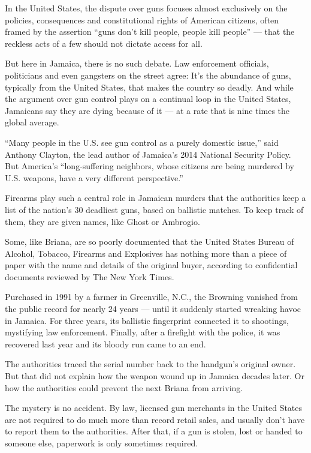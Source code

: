 In the United States, the dispute over guns focuses almost exclusively
on the policies, consequences and constitutional rights of American
citizens, often framed by the assertion ``guns don't kill people, people
kill people'' --- that the reckless acts of a few should not dictate
access for all.

But here in Jamaica, there is no such debate. Law enforcement officials,
politicians and even gangsters on the street agree: It's the abundance
of guns, typically from the United States, that makes the country so
deadly. And while the argument over gun control plays on a continual
loop in the United States, Jamaicans say they are dying because of it
--- at a rate that is nine times the global average.

``Many people in the U.S. see gun control as a purely domestic issue,''
said Anthony Clayton, the lead author of Jamaica's 2014 National
Security Policy. But America's ``long-suffering neighbors, whose
citizens are being murdered by U.S. weapons, have a very different
perspective.''

Firearms play such a central role in Jamaican murders that the
authorities keep a list of the nation's 30 deadliest guns, based on
ballistic matches. To keep track of them, they are given names, like
Ghost or Ambrogio.

Some, like Briana, are so poorly documented that the United States
Bureau of Alcohol, Tobacco, Firearms and Explosives has nothing more
than a piece of paper with the name and details of the original buyer,
according to confidential documents reviewed by The New York Times.

Purchased in 1991 by a farmer in Greenville, N.C., the Browning vanished
from the public record for nearly 24 years --- until it suddenly started
wreaking havoc in Jamaica. For three years, its ballistic fingerprint
connected it to shootings, mystifying law enforcement. Finally, after a
firefight with the police, it was recovered last year and its bloody run
came to an end.

The authorities traced the serial number back to the handgun's original
owner. But that did not explain how the weapon wound up in Jamaica
decades later. Or how the authorities could prevent the next Briana from
arriving.

The mystery is no accident. By law, licensed gun merchants in the United
States are not required to do much more than record retail sales, and
usually don't have to report them to the authorities. After that, if a
gun is stolen, lost or handed to someone else, paperwork is only
sometimes required.


